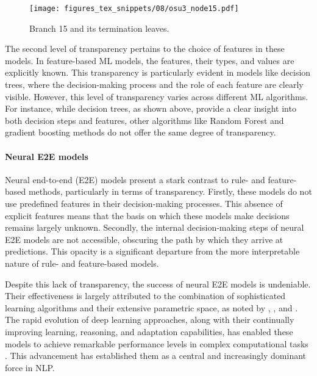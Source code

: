 \begin{figure}
	\texttt{[image: figures\_tex\_snippets/08/osu3\_node15.pdf]}
	\caption{Branch 15 and its termination leaves.}
	\label{fig:dtterminationnode}
\end{figure}

\largerpage
The second level of transparency pertains to the choice of features in these models. In feature-based ML models, the features, their types, and values are explicitly known. This transparency is particularly evident in models like decision trees, where the decision-making process and the role of each feature are clearly visible. However, this level of transparency varies across different ML algorithms. For instance, while decision trees, as shown above, provide a clear insight into both decision steps and features, other algorithms like Random Forest and gradient boosting methods do not offer the same degree of transparency.

\paragraph*{Neural E2E models}
\begin{sloppypar}
Neural end-to-end (E2E) models present a stark contrast to rule- and feature-based methods, particularly in terms of transparency. Firstly, these models do not use predefined features in their decision-making processes. This absence of explicit features means that the basis on which these models make decisions remains largely unknown. Secondly, the internal decision-making steps of neural E2E models are not accessible, obscuring the path by which they arrive at predictions. This opacity is a significant departure from the more interpretable nature of rule- and feature-based models.
\end{sloppypar}

Despite this lack of transparency, the success of neural E2E models is undeniable. Their effectiveness is largely attributed to the combination of sophisticated learning algorithms and their extensive parametric space, as noted by \citet{castelvecchi2016can}, \citet{West2018}, and \citet{BARREDOARRIETA202082}. The rapid evolution of deep learning approaches, along with their continually improving learning, reasoning, and adaptation capabilities, has enabled these models to achieve remarkable performance levels in complex computational tasks \citep{West2018}. This advancement has established them as a central and increasingly dominant force in NLP.

